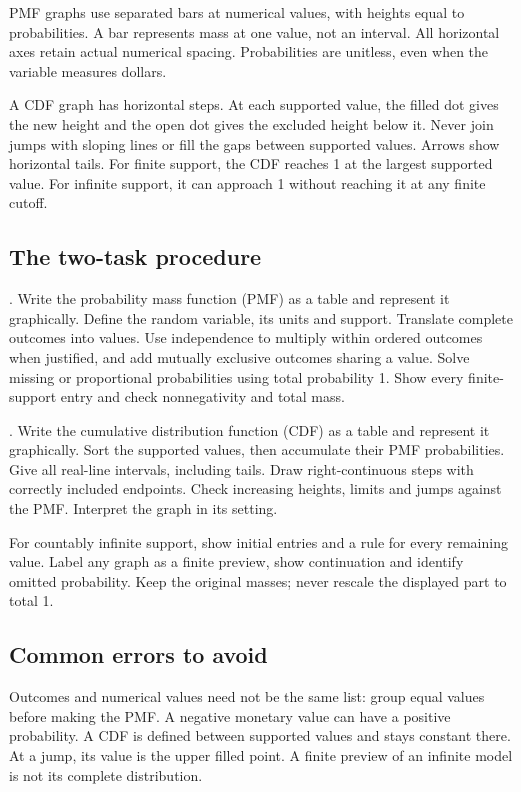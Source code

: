 \par\smallskip
PMF graphs use separated bars at numerical values, with heights equal to probabilities. A bar represents mass at one value, not an interval. All horizontal axes retain actual numerical spacing. Probabilities are unitless, even when the variable measures dollars.

A CDF graph has horizontal steps. At each supported value, the filled dot gives the new height and the open dot gives the excluded height below it. Never join jumps with sloping lines or fill the gaps between supported values. Arrows show horizontal tails. For finite support, the CDF reaches 1 at the largest supported value. For infinite support, it can approach 1 without reaching it at any finite cutoff.
\clearpage
\subsection{The two-task procedure}
. Write the probability mass function (PMF) as a table and represent it graphically. Define the random variable, its units and support. Translate complete outcomes into values. Use independence to multiply within ordered outcomes when justified, and add mutually exclusive outcomes sharing a value. Solve missing or proportional probabilities using total probability 1. Show every finite-support entry and check nonnegativity and total mass.

. Write the cumulative distribution function (CDF) as a table and represent it graphically. Sort the supported values, then accumulate their PMF probabilities. Give all real-line intervals, including tails. Draw right-continuous steps with correctly included endpoints. Check increasing heights, limits and jumps against the PMF. Interpret the graph in its setting.

For countably infinite support, show initial entries and a rule for every remaining value. Label any graph as a finite preview, show continuation and identify omitted probability. Keep the original masses; never rescale the displayed part to total 1.
\subsection{Common errors to avoid}
Outcomes and numerical values need not be the same list: group equal values before making the PMF. A negative monetary value can have a positive probability. A CDF is defined between supported values and stays constant there. At a jump, its value is the upper filled point. A finite preview of an infinite model is not its complete distribution.
\secInicio
\clearpage
